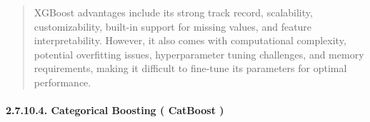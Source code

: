 \documentclass[
]{article}
\begin{document}
\begin{quote}
XGBoost advantages include its strong track record, scalability,
customizability, built-in support for missing values, and feature
interpretability. However, it also comes with computational complexity,
potential overfitting issues, hyperparameter tuning challenges, and
memory requirements, making it difficult to fine-tune its parameters for
optimal performance.
\end{quote}

\hypertarget{categorical-boosting-catboost}{%
\paragraph{\texorpdfstring{\textbf{2.7.10.4. Categorical Boosting (
CatBoost
)}}{2.7.10.4. Categorical Boosting ( CatBoost )}}\label{categorical-boosting-catboost}}
\end{document}
